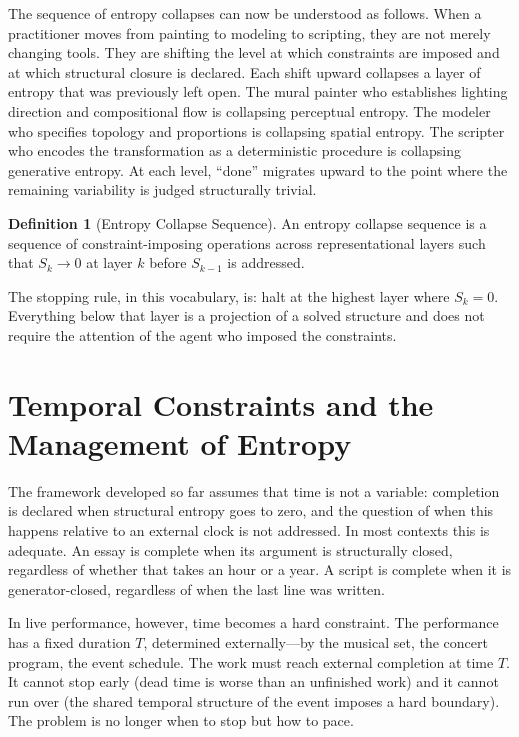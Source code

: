 \documentclass[12pt, twoside]{article}
\theoremstyle{plain}
\theoremstyle{definition}
\newtheorem{definition}[theorem]{Definition}
\theoremstyle{remark}
\begin{document}
The sequence of entropy collapses can now be understood as follows. When a practitioner moves from painting to modeling to scripting, they are not merely changing tools. They are shifting the level at which constraints are imposed and at which structural closure is declared. Each shift upward collapses a layer of entropy that was previously left open. The mural painter who establishes lighting direction and compositional flow is collapsing perceptual entropy. The modeler who specifies topology and proportions is collapsing spatial entropy. The scripter who encodes the transformation as a deterministic procedure is collapsing generative entropy. At each level, ``done'' migrates upward to the point where the remaining variability is judged structurally trivial.

\begin{definition}[Entropy Collapse Sequence]
An entropy collapse sequence is a sequence of constraint-imposing operations across representational layers such that $S_k \to 0$ at layer $k$ before $S_{k-1}$ is addressed.
\end{definition}

The stopping rule, in this vocabulary, is: halt at the highest layer where $S_k = 0$. Everything below that layer is a projection of a solved structure and does not require the attention of the agent who imposed the constraints.

\section{Temporal Constraints and the Management of Entropy}
\label{sec:temporal}

The framework developed so far assumes that time is not a variable: completion is declared when structural entropy goes to zero, and the question of when this happens relative to an external clock is not addressed. In most contexts this is adequate. An essay is complete when its argument is structurally closed, regardless of whether that takes an hour or a year. A script is complete when it is generator-closed, regardless of when the last line was written.

In live performance, however, time becomes a hard constraint. The performance has a fixed duration $T$, determined externally---by the musical set, the concert program, the event schedule. The work must reach external completion at time $T$. It cannot stop early (dead time is worse than an unfinished work) and it cannot run over (the shared temporal structure of the event imposes a hard boundary). The problem is no longer when to stop but how to pace.
\end{document}
